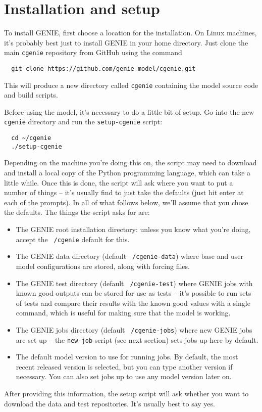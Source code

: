 \documentclass[a4paper,10pt,article]{memoir}
\begin{document}
\section{Installation and setup}

To install GENIE, first choose a location for the installation.  On
Linux machines, it's probably best just to install GENIE in your home
directory.  Just clone the main \texttt{cgenie} repository from GitHub
using the command
\begin{verbatim}
  git clone https://github.com/genie-model/cgenie.git
\end{verbatim}
This will produce a new directory called \texttt{cgenie} containing
the model source code and build scripts.

Before using the model, it's necessary to do a little bit of setup.
Go into the new \texttt{cgenie} directory and run the
\texttt{setup-cgenie} script:
\begin{verbatim}
  cd ~/cgenie
  ./setup-cgenie
\end{verbatim}
Depending on the machine you're doing this on, the script may need to
download and install a local copy of the Python programming language,
which can take a little while.  Once this is done, the script will ask
where you want to put a number of things -- it's usually find to just
take the defaults (just hit enter at each of the prompts).  In all of
what follows below, we'll assume that you chose the defaults.  The
things the script asks for are:
\begin{itemize}
  \item{The GENIE root installation directory: unless you know what
    you're doing, accept the \texttt{~/cgenie} default for this.}
  \item{The GENIE data directory (default \texttt{~/cgenie-data})
    where base and user model configurations are stored, along with
    forcing files.}
  \item{The GENIE test directory (default \texttt{~/cgenie-test})
    where GENIE jobs with known good outputs can be stored for use as
    tests -- it's possible to run sets of tests and compare their
    results with the known good values with a single command, which is
    useful for making sure that the model is working.}
  \item{The GENIE jobs directory (default \texttt{~/cgenie-jobs})
    where new GENIE jobs are set up -- the \texttt{new-job} script
    (see next section) sets jobs up here by default.}
  \item{The default model version to use for running jobs.  By
    default, the most recent released version is selected, but you can
    type another version if necessary.  You can also set jobs up to
    use any model version later on.}
\end{itemize}
After providing this information, the setup script will ask whether
you want to download the data and test repositories.  It's usually
best to say yes.
\end{document}
